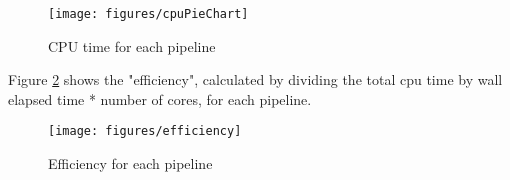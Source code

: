 \documentclass[DM,authoryear,toc]{lsstdoc}
\begin{document}
\begin{figure}[htbp]
        \begin{center}
                 \texttt{[image: figures/cpuPieChart]}
                 \caption{CPU time for each pipeline}
                 \label{fig:cpuPieChart}
        \end{center}
\end{figure}

Figure \ref{fig:efficiency} shows the "efficiency", calculated by dividing the total cpu time by wall elapsed time * number of cores, for each pipeline.

\begin{figure}[htbp]
        \begin{center}
                 \texttt{[image: figures/efficiency]}
                 \caption{Efficiency for each pipeline}
                 \label{fig:efficiency}
        \end{center}
\end{figure}
\end{document}
